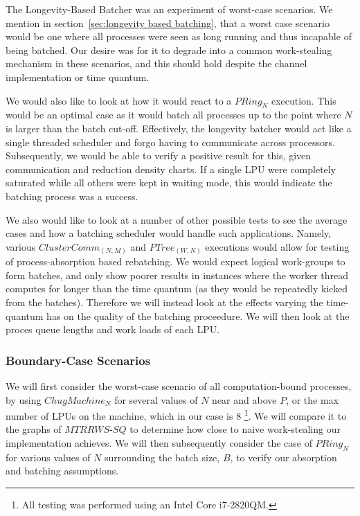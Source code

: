 The Longevity-Based Batcher was an experiment of worst-case scenarios. We
mention in section~\ref{sec:longevity based batching}, that a worst case 
scenario would be one where all processes were seen as long running and 
thus incapable of being batched. Our desire was for it to degrade into 
a common work-stealing mechanism in these scenarios, and this should hold despite 
the channel implementation or time quantum.

We would also like to look at how it would react to a $PRing_N$ execution. This
would be an optimal case as it would batch all processes up to the point where
$N$ is larger than the batch cut-off. Effectively, the longevity batcher would
act like a single threaded scheduler and forgo having to communicate across
processors. Subsequently, we would be able to verify a positive result for this, given
communication and reduction density charts. If a single LPU were completely
saturated while all others were kept in waiting mode, this would indicate the
batching process was a success.

We also would like to look at a number of other possible tests to see the
average cases and how a batching scheduler would handle such applications.
Namely, various $ClusterComm_{(N,M)}$ and $PTree_{(W,N)}$ executions would allow 
for testing of process-absorption based rebatching. We would expect logical
work-groups to form batches, and only show poorer results in instances where
the worker thread computes for longer than the time quantum (as they would be
repeatedly kicked from the batches). Therefore we will instead look at the
effects varying the time-quantum has on the quality of the batching proceedure.
We will then look at the proces queue lengths and work loads of each LPU.

\subsubsection{Boundary-Case Scenarios}\label{sec:results-longbatcher-worstcase}

We will first consider the worst-case scenario of all computation-bound processes, by 
using $ChugMachine_N$ for several values of $N$ near and 
above $P$, or the max number of LPUs on the machine, which in our case 
is $8$ \footnote{All testing was performed using an Intel Core i7-2820QM.}.  We will 
compare it to the graphs of $MTRRWS$-$SQ$ to determine how close to naive
work-stealing our implementation achieves. We will then subsequently consider
the case of $PRing_N$ for various values of $N$ surrounding the batch size, $B$,
to verify our absorption and batching assumptions.

